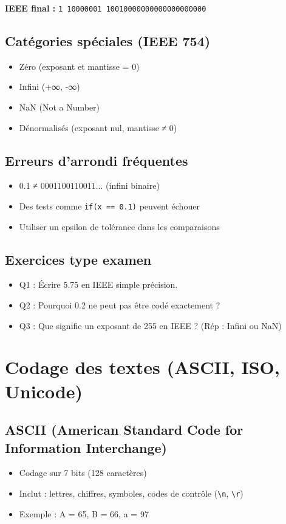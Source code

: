 \documentclass[12pt,a4paper]{article}
\begin{document}
\textbf{IEEE final :} \texttt{1 10000001 10010000000000000000000}

\subsection{Catégories spéciales (IEEE 754)}
\begin{itemize}
  \item Zéro (exposant et mantisse = 0)
  \item Infini (+∞, -∞)
  \item NaN (Not a Number)
  \item Dénormalisés (exposant nul, mantisse ≠ 0)
\end{itemize}

\subsection{Erreurs d'arrondi fréquentes}
\begin{itemize}
  \item 0.1 ≠ $0001100110011...$ (infini binaire)
  \item Des tests comme \texttt{if(x == 0.1)} peuvent échouer
  \item Utiliser un epsilon de tolérance dans les comparaisons
\end{itemize}

\subsection{Exercices type examen}
\begin{itemize}
  \item Q1 : Écrire 5.75 en IEEE simple précision.
  \item Q2 : Pourquoi 0.2 ne peut pas être codé exactement ?
  \item Q3 : Que signifie un exposant de 255 en IEEE ? (Rép : Infini ou NaN)
\end{itemize}

\newpage

\section{Codage des textes (ASCII, ISO, Unicode)}

\subsection{ASCII (American Standard Code for Information Interchange)}
\begin{itemize}
  \item Codage sur 7 bits (128 caractères)
  \item Inclut : lettres, chiffres, symboles, codes de contrôle (\texttt{\textbackslash n}, \texttt{\textbackslash r})
  \item Exemple : A = 65, B = 66, a = 97
\end{itemize}
\end{document}
